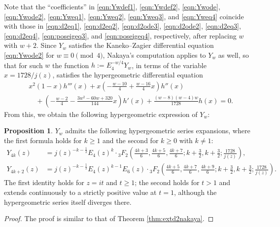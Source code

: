 \documentclass[10pt,reqno]{amsproc}
\newcommand{\1}{\mathds{1}}	%
\theoremstyle{definition}
\newtheorem{proposition}[theorem]{Proposition}
\theoremstyle{remark}
\begin{document}
Note that the ``coefficients'' in \eqref{eqn:Ywdef1}, \eqref{eqn:Ywdef2}, \eqref{eqn:Ywode}, \eqref{eqn:Ywode2}, \eqref{eqn:Yweq1}, \eqref{eqn:Yweq2}, \eqref{eqn:Yweq3}, and \eqref{eqn:Yweq4} coincide with those in \eqref{eqn:d2eq1}, \eqref{eqn:d2eq2}, \eqref{eqn:d2ode3}, \eqref{eqn:d2ode2}, \eqref{eqn:d2eq3}, \eqref{eqn:d2eq4}, \eqref{eqn:poseigeq3}, and \eqref{eqn:poseigeq4}, respectively, after replacing $w$ with $w + 2$.
Since $Y_w$ satisfies the Kaneko--Zagier differential equation \eqref{eqn:Ywode2} for $w \equiv 0 \pmod 4$, Nakaya's computation applies to $Y_w$ as well, so that for such $w$ the function $h := E_4^{-w/4} Y_w$, in terms of the variable $x = 1728/j(z)$, satisfies the hypergeometric differential equation
\begin{equation}
    \label{eqn:hpergeom}
    \begin{aligned}
    &x^2(1 - x) h'''(x) + x \left(-\frac{w-10}{4} + \frac{w-16}{4} x\right) h''(x) \\
    &\quad + \left(-\frac{w-2}{4} - \frac{3w^2 - 60w + 320}{144}x\right) h'(x) + \frac{(w-8)(w-4)w}{1728} h(x) = 0.
    \end{aligned}
\end{equation}
From this, we obtain the following hypergeometric expression of $Y_w$:
\begin{proposition}
\label{prop:Yhypergeom}
$Y_w$ admits the following hypergeometric series expansions, where the first formula holds for $k \geq 1$ and the second for $k \geq 0$ with $k \neq 1$:
\begin{align}
    Y_{4k}(z) &= j(z)^{-k - \frac{1}{2}} E_4(z)^{k} \cdot {}_{3}F_{2} \left(\frac{4k + 3}{6}, \frac{4k+5}{6}, \frac{4k+7}{6}; k + \frac{3}{2}, k + \frac{3}{2}; \frac{1728}{j(z)}\right), \\
    Y_{4k + 2}(z) &= j(z)^{-k -\frac{1}{2}} E_4(z)^{k - 1} E_6(z) \cdot {}_{3}F_{2} \left(\frac{4k + 5}{6}, \frac{4k+7}{6}, \frac{4k+9}{6}; k + \frac{3}{2}, k + \frac{3}{2}; \frac{1728}{j(z)}\right).
\end{align}
The first identity holds for $z=it$ and $t\geq1$; the second holds for $t>1$ and extends continuously to a strictly positive value at $t=1$, although the hypergeometric series itself diverges there.
\end{proposition}
\begin{proof}
The proof is similar to that of Theorem \ref{thm:extd2nakaya}.
\end{proof}
\end{document}
